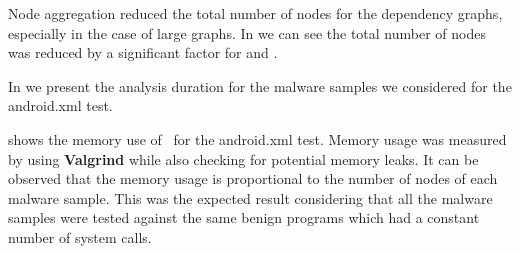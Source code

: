 
Node aggregation reduced the total number of nodes for the dependency graphs, especially in the case of large graphs. In  we can see the total number of nodes was reduced by a significant factor for  and .

In  we present the analysis duration for the malware samples we considered for the android.xml test.


 shows the memory use of \project\ for the android.xml test. Memory usage was measured by using \textbf{Valgrind} while also checking for potential memory leaks. It can be observed that the memory usage is proportional to the number of nodes of each malware sample. This was the expected result considering that all the malware samples were tested against the same benign programs which had a constant number of system calls.

